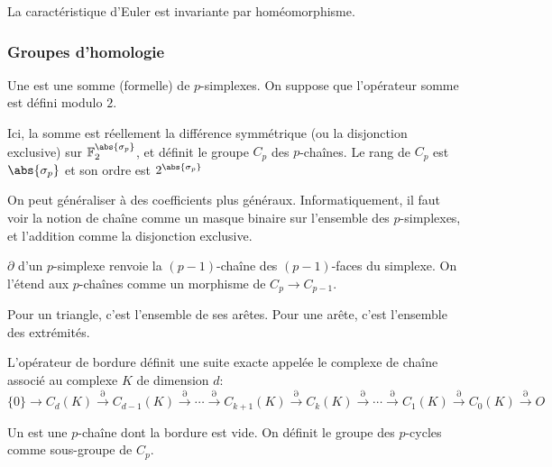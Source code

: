 \begin{proposition}
	La caractéristique d'Euler est invariante par homéomorphisme.
\end{proposition}

\subsubsection{Groupes d'homologie}
\begin{definition}
	Une  est une somme (formelle) de $p$-simplexes. On suppose que l'opérateur somme est défini modulo $2$.
\end{definition}
Ici, la somme est réellement la différence symmétrique (ou la disjonction exclusive) sur $\mathbb{F}_{2}^{\abs{\sigma_{p}}}$, et définit le groupe $C_{p}$ des $p$-chaînes.
Le rang de $C_{p}$ est $\abs{\sigma_{p}}$ et son ordre est $2^{\abs{\sigma_{p}}}$


On peut généraliser à des coefficients plus généraux.
Informatiquement, il faut voir la notion de chaîne comme un masque binaire sur l'ensemble des $p$-simplexes, et l'addition comme la disjonction exclusive.

\begin{definition}
	 $\partial$ d'un $p$-simplexe renvoie la $(p-1)$-chaîne des $(p-1)$-faces du simplexe.
	On l'étend aux $p$-chaînes comme un morphisme de $C_{p} \to C_{p - 1}$.
\end{definition}

Pour un triangle, c'est l'ensemble de ses arêtes. Pour une arête, c'est l'ensemble des extrémités.

\begin{proposition}
	L'opérateur de bordure définit une suite exacte appelée le complexe de chaîne associé au complexe $K$ de dimension $d$:
	\begin{equation*}
		\{0\} \to C_{d}(K) \xrightarrow{\partial} C_{d - 1}(K)
		\xrightarrow{\partial} \cdots
		\xrightarrow{\partial} C_{k + 1}(K)
		\xrightarrow{\partial} C_{k}(K)
		\xrightarrow{\partial} \cdots
		\xrightarrow{\partial} C_{1}(K)
		\xrightarrow{\partial} C_{0}(K)
		\xrightarrow{\partial} O
	\end{equation*}
\end{proposition}

\begin{definition}
	Un  est une $p$-chaîne dont la bordure est vide.
	On définit  le groupe des $p$-cycles comme sous-groupe de $C_{p}$.
\end{definition}

